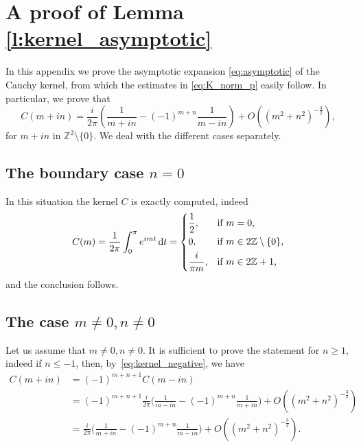 \documentclass[12pt,a4paper,reqno]{amsart}
\theoremstyle{definition}
\theoremstyle{definition}\newtheorem{defn}[thm]{Definition}
\begin{document}
    
    
        
    
    \appendix
    \section{A proof of Lemma \ref{l:kernel_asymptotic}}
    In this appendix we prove the asymptotic expansion \eqref{eq:asymptotic} of the Cauchy kernel, from which the estimates in \eqref{eq:K_norm_p} easily follow. In particular, we prove that
    \begin{equation*}
    C(m+in)=
    \frac{i}{2\pi}\left(
    \frac{1}{m+in}
    -
    (-1)^{m+n}\frac{1}{m-in}
    \right)
    +O\!\left((m^2+n^2)^{-\frac32}\right),
    \end{equation*} for $m+in$ in $\mathbb{Z}^2\setminus\{0\}.$  We deal with the different cases separately.
    \subsection{The boundary case $n=0$}
    In this situation the kernel $C$ is exactly computed, indeed
    \[ C(m)=\frac 1{2\pi}\int_0^\pi e^{imt}\operatorname{d}\!t=\begin{dcases*}    \frac 12,&\text{if }$m=0$,\\
    0,&\text{if }$m\in 2\mathbb Z\setminus\{0\}$,\\
    \frac i{\pi m},&\text{if }$m\in 2\mathbb Z+1$,
    \end{dcases*}
    \]
    and the conclusion follows.
    \subsection{The case $m\neq0,n\neq 0$}
    Let us assume that $m\neq0,n\neq 0$. It is sufficient to prove the statement for $n\geqslant  1$, indeed if $n\leqslant -1$, then, by~\eqref{eq:kernel_negative}, we have
    \begin{align*}
        C(m+in)&=(-1)^{m+n+1}C(m-in)\\
        &=(-1)^{m+n+1}\frac i{2\pi}\Big( \frac 1{m-in}-(-1)^{m+n}\frac 1{m+in}\Big)+O((m^2+n^2)^{-\frac{3}{2}})\\
        &=\frac i{2\pi}\Big(\frac 1{m+in}-(-1)^{m+n}\frac 1{m-in}\Big)+O((m^2+n^2)^{-\frac{3}{2}}).
    \end{align*}
    
\end{document}
